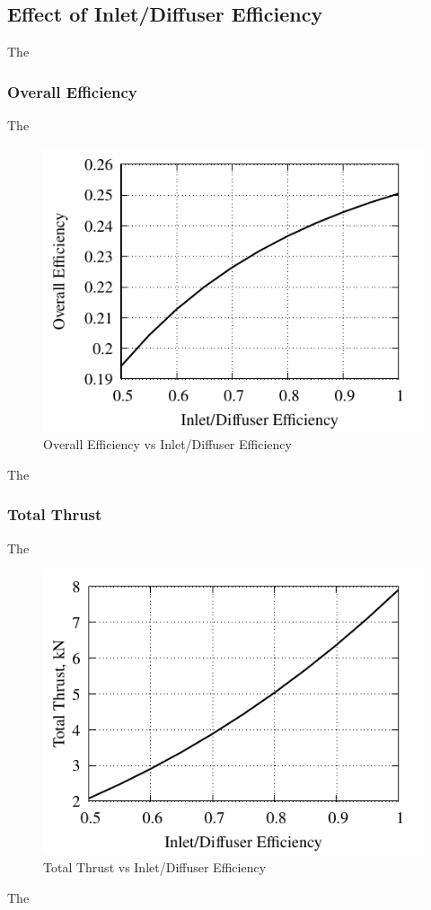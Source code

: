 \documentclass[conf]{new-aiaa} %
\begin{document}
\subsection{Effect of Inlet/Diffuser Efficiency} %
The

\subsubsection{Overall Efficiency}
The

\begin{figure}[hbt!] %
    \centering
    \includegraphics[]{media/performance_parameter_files/part_f_eta_o.pdf}
    \caption{\label{fig:partfetao}Overall Efficiency vs Inlet/Diffuser Efficiency}
\end{figure}
The

\subsubsection{Total Thrust}
The

\begin{figure}[hbt!] %
    \centering
    \includegraphics[]{media/performance_parameter_files/part_f_T.pdf}
    \caption{\label{fig:partft}Total Thrust vs Inlet/Diffuser Efficiency}
\end{figure}
The
\end{document}
